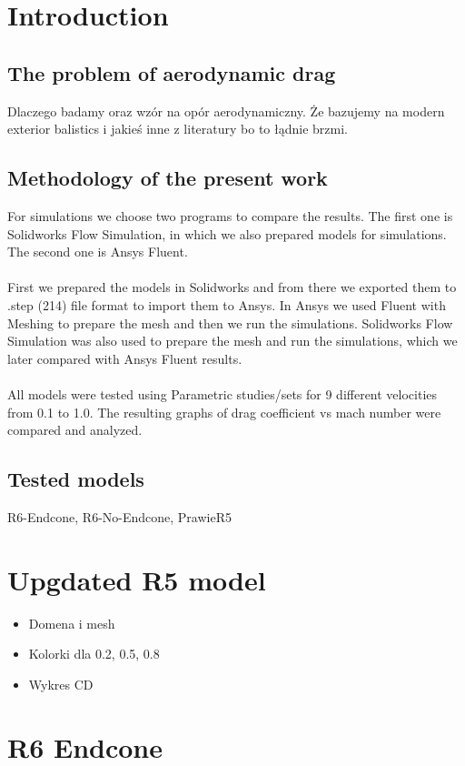 \documentclass{article}
\begin{document}
\section{Introduction}
\subsection{The problem of aerodynamic drag}
Dlaczego badamy oraz wzór na opór aerodynamiczny. Że bazujemy na modern exterior balistics i jakieś inne z literatury bo to łądnie brzmi.

\subsection{Methodology of the present work}
For simulations we choose two programs to compare the results. The first one is 
Solidworks Flow Simulation, in which we also prepared models for simulations. 
The second one is Ansys Fluent.\\\\
First we prepared the models in Solidworks and from there we exported them to 
.step (214) file format to import them to Ansys. In Ansys we used Fluent with
Meshing to prepare the mesh and then we run the simulations. Solidworks Flow Simulation
was also used to prepare the mesh and run the simulations, which we later compared with
Ansys Fluent results.\\\\
All models were tested using Parametric studies/sets for 9 different velocities 
from 0.1 to 1.0. The resulting graphs of drag coefficient vs mach number were 
compared and analyzed.


\subsection{Tested models}
R6-Endcone, R6-No-Endcone, PrawieR5

\section{Upgdated R5 model}
\begin{itemize}
    \item Domena i mesh
    \item Kolorki dla 0.2, 0.5, 0.8
    \item Wykres CD
\end{itemize}

\section{R6 Endcone}
\end{document}
